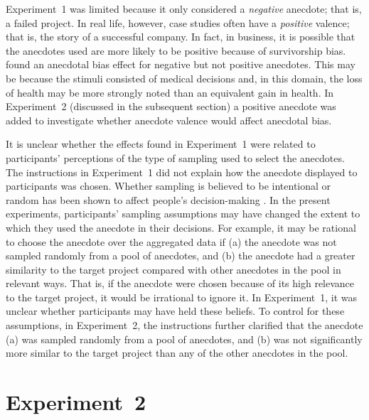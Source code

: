 \documentclass[a4paper, nobind]{templates/ociamthesis}
\theoremstyle{definition}
\theoremstyle{definition}
\theoremstyle{definition}
\theoremstyle{definition}
\theoremstyle{remark}
\begin{document}
Experiment~1 was limited because it only considered a \emph{negative} anecdote; that
is, a failed project. In real life, however, case studies often have a
\emph{positive} valence; that is, the story of a successful company. In fact, in
business, it is possible that the anecdotes used are more likely to be positive
because of survivorship bias. \textcite{jaramillo2019} found an anecdotal bias effect for
negative but not positive anecdotes. This may be because the stimuli consisted
of medical decisions and, in this domain, the loss of health may be more
strongly noted than an equivalent gain in health. In Experiment~2 (discussed in
the subsequent section) a positive anecdote was added to investigate whether
anecdote valence would affect anecdotal bias.

It is unclear whether the effects found in Experiment~1 were related to
participants' perceptions of the type of sampling used to select the anecdotes.
The instructions in Experiment~1 did not explain how the anecdote displayed to
participants was chosen. Whether sampling is believed to be intentional or
random has been shown to affect people's decision-making \autocite[e.g.,][]{hayes2019}. In
the present experiments, participants' sampling assumptions may have changed the
extent to which they used the anecdote in their decisions. For example, it may
be rational to choose the anecdote over the aggregated data if (a) the anecdote
was not sampled randomly from a pool of anecdotes, and (b) the anecdote had a
greater similarity to the target project compared with other anecdotes in the
pool in relevant ways. That is, if the anecdote were chosen because of its high
relevance to the target project, it would be irrational to ignore it. In
Experiment~1, it was unclear whether participants may have held these beliefs.
To control for these assumptions, in Experiment~2, the instructions further
clarified that the anecdote (a) was sampled randomly from a pool of anecdotes,
and (b) was not significantly more similar to the target project than any of the
other anecdotes in the pool.

\hypertarget{anecdotes-2}{%
\section{Experiment~2}\label{anecdotes-2}}
\end{document}
